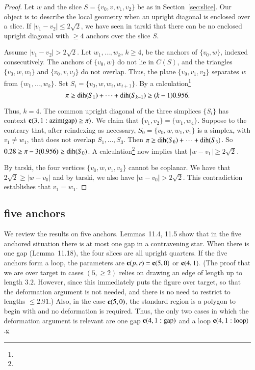 \begin{proof}
Let $w$ and the
slice $S=\{v_0,v,v_1,v_2\}$ be as in Section~\ref{sec:slice}.
Our object is to describe the local geometry when an upright
diagonal is enclosed over a slice. If $|v_1-v_2|\le
2\sqrt{2}$, we have seen in tarski that
there can be no enclosed upright diagonal with $\ge 4$ anchors
over the slice $S$.

Assume  $|v_1-v_2|>2\sqrt{2}$. Let $w_1,\ldots,w_k$, $k\ge4$, be the
anchors of $\{v_0,w\}$, indexed consecutively. The anchors of $\{v_0,w\}$ do not
lie in $C(S)$, and the triangles $\{v_0,w,w_i\}$ and $\{v_0,v,v_j\}$ do not
overlap. Thus, the plane $\{v_0,v_1,v_2\}$ separates $w$ from
$\{w_1,\ldots,w_k\}$. Set $S_i=\{v_0,w,w_i,w_{i+1}\}$.
By a calculation\footnote{} %
    $$\pi\ge \operatorname{dih}(S_1)+\cdots+\operatorname{dih}(S_{k-1})\ge (k-1)0.956.$$

Thus, $k=4$. The common upright diagonal  of the three simplices
$\{S_i\}$ has context {\it ${\operatorname{\bf c}}{(3,1: {\operatorname{azim}}({\operatorname{gap}}) \ge \pi)}$}.  We claim that
$\{v_1,v_2\}=\{w_1,w_4\}$. Suppose to the contrary that, after
reindexing as necessary, $S_0=\{v_0,w,w_1,v_1\}$ is a simplex, with
$v_1\ne w_1$, that does not overlap $S_1,\ldots,S_3$. Then $\pi\ge
\operatorname{dih}(S_0)+\cdots+\operatorname{dih}(S_3)$. So
    $0.28\ge \pi-3(0.956)\ge \operatorname{dih}(S_0)$.
A calculation\footnote{} %
now implies that $|w-v_1|\ge 2\sqrt{2}$.

By tarski, the four vertices
$\{v_0,w,v_1,v_2\}$ cannot be coplanar.
We have that $2\sqrt{2}\ge|w-v_0|$ and by tarski,
we also have $|w-v_0|>2\sqrt2$.
This contradiction establishes that $v_1=w_1$.
\end{proof}





\subsection{five anchors}


We review the results on five anchors. 
Lemmas~11.4, 11.5 show that in the five anchored situation there is at most one  gap in a contravening star.  When there is one  gap (Lemma~11.18), the four slices are all upright quarters. If the five anchors form a loop, the parameters are ${\operatorname{\bf c}}{(p,r)}={\operatorname{\bf c}}{(5,0)}$ or ${\operatorname{\bf c}}{(4,1)}$.  (The proof that we are over target in cases $(5,\ge2)$ relies on drawing an edge of length up to length $3.2$.  However, since this immediately puts the figure over target, so that the deformation argument is not needed, and there is no need to restrict to lengths $\le 2.91$.) Also, in the case ${\operatorname{\bf c}}{(5,0)}$, the standard region is a polygon to begin with and no deformation is required.  Thus, the only two cases in which the deformation argument is relevant are one  gap ${\operatorname{\bf c}}{(4,1:{\operatorname{gap}})}$ and a loop ${\operatorname{\bf c}}{(4,1:{\operatorname{loop}})}$.g


